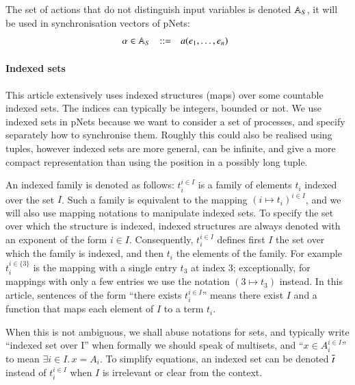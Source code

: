 \documentclass{elsarticle}
\begin{document}
The set of actions that do not distinguish input variables is denoted $\mathbb{A}_S$, it will be used in synchronisation vectors of pNets:
\[\begin{array}[l]{rcl@{\quad}l}
  \alpha\in \AlgAS &::=&a(e_1,\ldots,e_n)
\end{array}
\]






\paragraph{Indexed sets}



This article extensively uses indexed structures 
(maps) over some countable indexed sets.   The indices can typically be
integers, bounded or not. We use indexed sets in pNets because we want to consider a set of processes, and specify separately how to synchronise them. Roughly this could also be realised using tuples, however indexed sets are more general, can be infinite, and give a more compact representation than using the position in a possibly long tuple.

An indexed family is denoted as
follows: $t_i^{i\in I}$ is a family of elements $t_i$ indexed over the
set $I$. Such a family
is equivalent to the mapping $(i\mapsto t_i)^{i\in I}$, and we will also use mapping 
notations to manipulate indexed sets.
To specify the set over which the structure is indexed, 
indexed structures are always denoted with an exponent of the form $i\in I$.
Consequently, $t_i^{i\in I}$ defines first $I$ the set over which the
family is indexed, and then $t_i$ the elements of the family.
For example $t_i^{i\in\{3\}}$ is
the mapping with a single entry $t_3$ at index $3$; exceptionally, for mappings with
only a few entries we use the notation $(3\mapsto t_3)$ instead.
In this article, sentences of the form ``there exists $t_i^{i\in I}$'' means there exist $I$ and a function that maps each element of $I$ to a term $t_i$.

When this is not ambiguous, we shall abuse notations 
for sets, and typically write ``indexed set over I'' when  
formally we should speak of multisets, and ``$x\in
A_i^{i\in I}$'' to mean $\exists i\in I.\, x=A_i$.
To simplify equations, an indexed set can be denoted $\overline{t}$
instead of $t_i^{i\in I}$ when $I$ is irrelevant or clear from the context.
\end{document}
